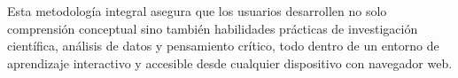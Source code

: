 Esta metodología integral asegura que los usuarios desarrollen no solo comprensión conceptual sino también habilidades prácticas de investigación científica, análisis de datos y pensamiento crítico, todo dentro de un entorno de aprendizaje interactivo y accesible desde cualquier dispositivo con navegador web.